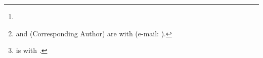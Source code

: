 \documentclass[journal,10pt,twocolumn]{packages/publishers/ieee/IEEEtran}
\title{\PaperTitle}
\author{\AuthorA,~\IEEEmembership{\RoleA,}
        \AuthorB,~\IEEEmembership{\RoleB,}
        and~\AuthorC,~\IEEEmembership{\RoleC}%
\thanks{\GrantFunding}%
\thanks{\AuthorA{} and \AuthorB{} (Corresponding Author) are with \AffilA{} (e-mail: \EmailB).}%
\thanks{\AuthorC{} is with \AffilB{}.}%
}
\begin{document}
\maketitle

\begin{abstract}
\PaperAbstract
\end{abstract}

\begin{IEEEkeywords}
\PaperKeywords
\end{IEEEkeywords}









\end{document}
